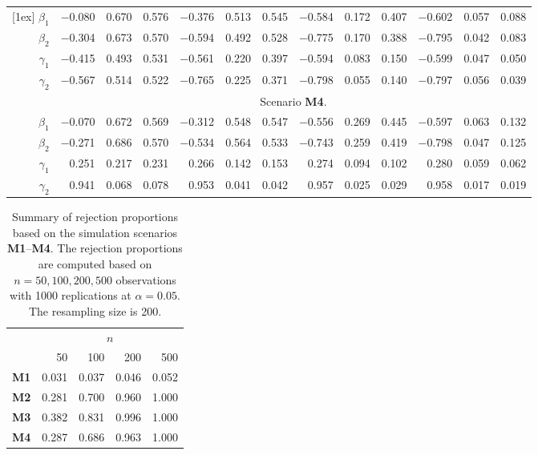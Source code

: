 \documentclass[a4paper,10pt]{article}
\begin{document}
\begin{table}[ht]
\begin{tabular}{r rrr rrr rrr rrr}
[1ex]
$\beta_1$ & $-$0.080 & 0.670 & 0.576 & $-$0.376 & 0.513 & 0.545 & $-$0.584 & 0.172 & 0.407 & $-$0.602 & 0.057 & 0.088 \\ 
$\beta_2$ & $-$0.304 & 0.673 & 0.570 & $-$0.594 & 0.492 & 0.528 & $-$0.775 & 0.170 & 0.388 & $-$0.795 & 0.042 & 0.083 \\ 
$\gamma_1$ & $-$0.415 & 0.493 & 0.531 & $-$0.561 & 0.220 & 0.397 & $-$0.594 & 0.083 & 0.150 & $-$0.599 & 0.047 & 0.050 \\ 
$\gamma_2$ & $-$0.567 & 0.514 & 0.522 & $-$0.765 & 0.225 & 0.371 & $-$0.798 & 0.055 & 0.140 & $-$0.797 & 0.056 & 0.039 \\ 
[1ex]
& \multicolumn{12}{c}{Scenario \textbf{M4}.}\\
[1ex]
$\beta_1$ & $-$0.070 & 0.672 & 0.569 & $-$0.312 & 0.548 & 0.547 & $-$0.556 & 0.269 & 0.445 & $-$0.597 & 0.063 & 0.132 \\ 
$\beta_2$ & $-$0.271 & 0.686 & 0.570 & $-$0.534 & 0.564 & 0.533 & $-$0.743 & 0.259 & 0.419 & $-$0.798 & 0.047 & 0.125 \\ 
$\gamma_1$ & 0.251 & 0.217 & 0.231 & 0.266 & 0.142 & 0.153 & 0.274 & 0.094 & 0.102 & 0.280 & 0.059 & 0.062 \\ 
$\gamma_2$ & 0.941 & 0.068 & 0.078 & 0.953 & 0.041 & 0.042 & 0.957 & 0.025 & 0.029 & 0.958 & 0.017 & 0.019 \\ 
\bottomrule
\end{tabular}
\end{table}

\begin{table}[ht]
\centering
\caption{Summary of rejection proportions based on the simulation scenarios \textbf{M1}--\textbf{M4}.
The rejection proportions are computed based on $n=50, 100, 200, 500$ observations with 1000 replications at $\alpha = 0.05$.
The resampling size is 200. 
}
\begin{tabular}{rrrrr}
\toprule
& \multicolumn{4}{c}{$n$}\\
\cmidrule(l){2-5}
& 50 & 100 & 200 & 500 \\
\midrule
\textbf{M1} & 0.031 & 0.037 & 0.046 & 0.052 \\ 
\textbf{M2} & 0.281 & 0.700 & 0.960 & 1.000 \\ 
\textbf{M3} & 0.382 & 0.831 & 0.996 & 1.000 \\ 
\textbf{M4} & 0.287 & 0.686 & 0.963 & 1.000 \\ 
\bottomrule
\end{tabular}
\end{table}
\end{document}

